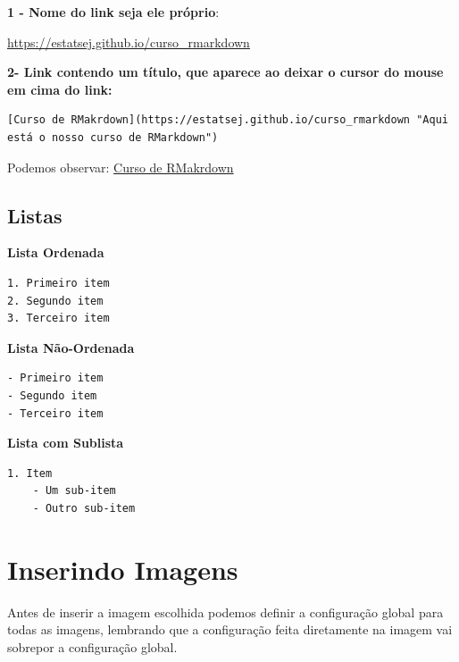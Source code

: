 \documentclass[
]{book}
\newenvironment{Shaded}{\begin{snugshade}}{\end{snugshade}}
\newcommand{\InformationTok}[1]{\textcolor[rgb]{0.56,0.35,0.01}{\textbf{\textit{#1}}}}
\begin{document}
\textbf{1 - Nome do link seja ele próprio}:

\url{https://estatsej.github.io/curso_rmarkdown}

\textbf{2- Link contendo um título, que aparece ao deixar o cursor do mouse em cima do link:}

\begin{verbatim}
[Curso de RMakrdown](https://estatsej.github.io/curso_rmarkdown "Aqui está o nosso curso de RMarkdown")
\end{verbatim}

Podemos observar:
\href{https://estatsej.github.io/curso_rmarkdown}{Curso de RMakrdown}

\hypertarget{listas}{%
\subsection{Listas}\label{listas}}

\textbf{Lista Ordenada}

\begin{verbatim}
1. Primeiro item
2. Segundo item
3. Terceiro item
\end{verbatim}

\textbf{Lista Não-Ordenada}

\begin{verbatim}
- Primeiro item
- Segundo item
- Terceiro item
\end{verbatim}

\textbf{Lista com Sublista}

\begin{verbatim}
1. Item
    - Um sub-item
    - Outro sub-item
\end{verbatim}

\hypertarget{inserindo-imagens}{%
\section{Inserindo Imagens}\label{inserindo-imagens}}

Antes de inserir a imagem escolhida podemos definir a configuração global para todas as imagens, lembrando que a configuração feita diretamente na imagem vai sobrepor a configuração global.

\begin{Shaded}
\end{Shaded}
\end{document}
